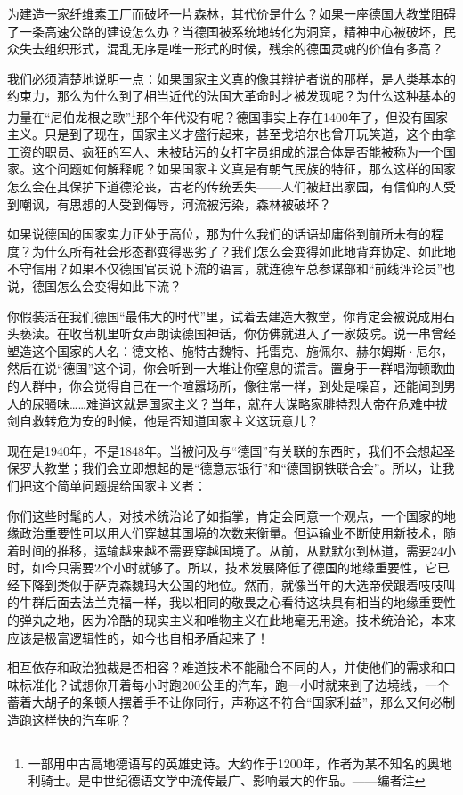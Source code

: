 \documentclass[UTF8]{ctexart}
\begin{document}
为建造一家纤维素工厂而破坏一片森林，其代价是什么？如果一座德国大教堂阻碍了一条高速公路的建设怎么办？当德国被系统地转化为洞窟，精神中心被破坏，民众失去组织形式，混乱无序是唯一形式的时候，残余的德国灵魂的价值有多高？

我们必须清楚地说明一点：如果国家主义真的像其辩护者说的那样，是人类基本的约束力，那么为什么到了相当近代的法国大革命时才被发现呢？为什么这种基本的力量在“尼伯龙根之歌”\footnote{一部用中古高地德语写的英雄史诗。大约作于1200年，作者为某不知名的奥地利骑士。是中世纪德语文学中流传最广、影响最大的作品。——编者注}那个年代没有呢？德国事实上存在1400年了，但没有国家主义。只是到了现在，国家主义才盛行起来，甚至戈培尔也曾开玩笑道，这个由拿工资的职员、疯狂的军人、未被玷污的女打字员组成的混合体是否能被称为一个国家。这个问题如何解释呢？如果国家主义真是有朝气民族的特征，那么这样的国家怎么会在其保护下道德沦丧，古老的传统丢失——人们被赶出家园，有信仰的人受到嘲讽，有思想的人受到侮辱，河流被污染，森林被破坏？

如果说德国的国家实力正处于高位，那为什么我们的话语却庸俗到前所未有的程度？为什么所有社会形态都变得恶劣了？我们怎么会变得如此地背弃协定、如此地不守信用？如果不仅德国官员说下流的语言，就连德军总参谋部和“前线评论员”也说，德国怎么会变得如此下流？

你假装活在我们德国“最伟大的时代”里，试着去建造大教堂，你肯定会被说成用石头亵渎。在收音机里听女声朗读德国神话，你仿佛就进入了一家妓院。说一串曾经塑造这个国家的人名：德文格、施特古魏特、托雷克、施佩尔、赫尔姆斯·尼尔，然后在说“德国”这个词，你会听到一大堆让你窒息的谎言。置身于一群唱海顿歌曲的人群中，你会觉得自己在一个喧嚣场所，像往常一样，到处是噪音，还能闻到男人的尿骚味……难道这就是国家主义？当年，就在大谋略家腓特烈大帝在危难中拔剑自救转危为安的时候，他是否知道国家主义这玩意儿？

现在是1940年，不是1848年。当被问及与“德国”有关联的东西时，我们不会想起圣保罗大教堂；我们会立即想起的是“德意志银行”和“德国钢铁联合会”。所以，让我们把这个简单问题提给国家主义者：

你们这些时髦的人，对技术统治论了如指掌，肯定会同意一个观点，一个国家的地缘政治重要性可以用人们穿越其国境的次数来衡量。但运输业不断使用新技术，随着时间的推移，运输越来越不需要穿越国境了。从前，从默默尔到林道，需要24小时，如今只需要2个小时就够了。所以，技术发展降低了德国的地缘重要性，它已经下降到类似于萨克森魏玛大公国的地位。然而，就像当年的大选帝侯跟着吱吱叫的牛群后面去法兰克福一样，我以相同的敬畏之心看待这块具有相当的地缘重要性的弹丸之地，因为冷酷的现实主义和唯物主义在此地毫无用途。技术统治论，本来应该是极富逻辑性的，如今也自相矛盾起来了！

相互依存和政治独裁是否相容？难道技术不能融合不同的人，并使他们的需求和口味标准化？试想你开着每小时跑200公里的汽车，跑一小时就来到了边境线，一个蓄着大胡子的条顿人摆着手不让你同行，声称这不符合“国家利益”，那么又何必制造跑这样快的汽车呢？
\end{document}
